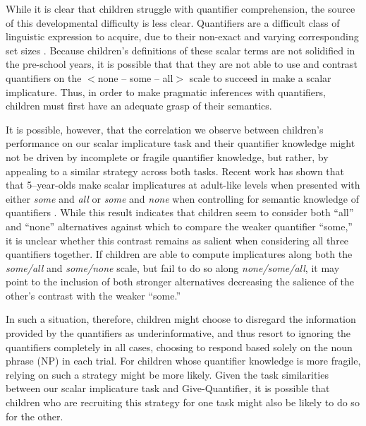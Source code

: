 \documentclass[man]{apa2}
\begin{document}
{While it is clear that children struggle with quantifier comprehension, the source of this developmental difficulty is less clear. Quantifiers are a difficult class of linguistic expression to acquire, due to their non-exact and varying corresponding set sizes . Because children's definitions of these scalar terms are not solidified in the pre-school years, it is possible that that they are not able to use and contrast quantifiers on the $<${\sc none -- some -- all}$>$ scale to succeed in make a scalar implicature. Thus, in order to make pragmatic inferences with quantifiers, children must first have an adequate grasp of their semantics. 

It is possible, however, that the correlation we observe between children's performance on our scalar implicature task and their quantifier knowledge might not be driven by incomplete or fragile quantifier knowledge, but rather, by appealing to a similar strategy across both tasks. Recent work has shown that that 5--year-olds make scalar implicatures at adult-like levels when presented with either \emph{some} and \emph{all} or \emph{some} and \emph{none} when controlling for semantic knowledge of quantifiers . While this result indicates that children seem to consider both ``all'' and ``none'' alternatives against which to compare the weaker quantifier ``some,'' it is unclear whether this contrast remains as salient when considering all three quantifiers together. If children are able to compute implicatures along both the \emph{some/all} and \emph{some/none} scale, but fail to do so along \emph{none/some/all}, it may point to the inclusion of both stronger alternatives decreasing the salience of the other's contrast with the weaker ``some.'' 

In such a situation, therefore, children might choose to disregard the information provided by the quantifiers as underinformative, and thus resort to ignoring the quantifiers completely in all cases, choosing to respond based solely on the noun phrase (NP) in each trial. For children whose quantifier knowledge is more fragile, relying on such a strategy might be more likely. Given the task similarities between our scalar implicature task and Give-Quantifier, it is possible that children who are recruiting this strategy for one task might also be likely to do so for the other. 

}
\end{document}
